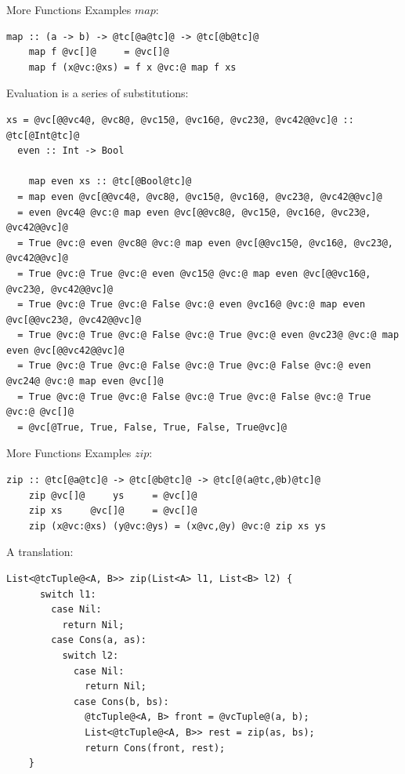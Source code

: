 \documentclass[xcolor={usenames,dvipsnames}]{beamer}
\begin{document}
\begin{frame}[fragile]{More Functions Examples}
  $map$:
  \begin{lstlisting}[style=hask]
    map :: (a -> b) -> @tc[@a@tc]@ -> @tc[@b@tc]@
    map f @vc[]@     = @vc[]@
    map f (x@vc:@xs) = f x @vc:@ map f xs
  \end{lstlisting}

  Evaluation is a series of substitutions:
  \begin{lstlisting}[style=hask]
  xs = @vc[@@vc4@, @vc8@, @vc15@, @vc16@, @vc23@, @vc42@@vc]@ :: @tc[@Int@tc]@
  even :: Int -> Bool

    map even xs :: @tc[@Bool@tc]@
  = map even @vc[@@vc4@, @vc8@, @vc15@, @vc16@, @vc23@, @vc42@@vc]@
  = even @vc4@ @vc:@ map even @vc[@@vc8@, @vc15@, @vc16@, @vc23@, @vc42@@vc]@
  = True @vc:@ even @vc8@ @vc:@ map even @vc[@@vc15@, @vc16@, @vc23@, @vc42@@vc]@
  = True @vc:@ True @vc:@ even @vc15@ @vc:@ map even @vc[@@vc16@, @vc23@, @vc42@@vc]@
  = True @vc:@ True @vc:@ False @vc:@ even @vc16@ @vc:@ map even @vc[@@vc23@, @vc42@@vc]@
  = True @vc:@ True @vc:@ False @vc:@ True @vc:@ even @vc23@ @vc:@ map even @vc[@@vc42@@vc]@
  = True @vc:@ True @vc:@ False @vc:@ True @vc:@ False @vc:@ even @vc24@ @vc:@ map even @vc[]@
  = True @vc:@ True @vc:@ False @vc:@ True @vc:@ False @vc:@ True @vc:@ @vc[]@
  = @vc[@True, True, False, True, False, True@vc]@

  \end{lstlisting}
\end{frame}

\begin{frame}[fragile]{More Functions Examples}
  $zip$:
  \begin{lstlisting}[style=hask]
    zip :: @tc[@a@tc]@ -> @tc[@b@tc]@ -> @tc[@(a@tc,@b)@tc]@
    zip @vc[]@     ys     = @vc[]@
    zip xs     @vc[]@     = @vc[]@
    zip (x@vc:@xs) (y@vc:@ys) = (x@vc,@y) @vc:@ zip xs ys
  \end{lstlisting}

  A translation:
  \begin{lstlisting}[style=hask]
    List<@tcTuple@<A, B>> zip(List<A> l1, List<B> l2) {
      switch l1:
        case Nil:
          return Nil;
        case Cons(a, as):
          switch l2:
            case Nil:
              return Nil;
            case Cons(b, bs):
              @tcTuple@<A, B> front = @vcTuple@(a, b);
              List<@tcTuple@<A, B>> rest = zip(as, bs);
              return Cons(front, rest);
    }
  \end{lstlisting}
\end{frame}
\end{document}
